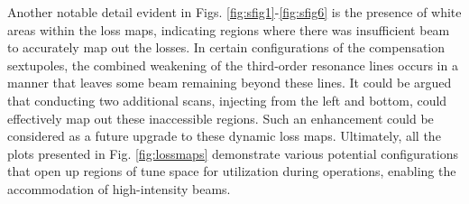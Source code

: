 Another notable detail evident in Figs. \ref{fig:sfig1}-\ref{fig:sfig6} is the presence of white areas within the loss maps, indicating regions where there was insufficient beam to accurately map out the losses. In certain configurations of the compensation sextupoles, the combined weakening of the third-order resonance lines occurs in a manner that leaves some beam remaining beyond these lines. It could be argued that conducting two additional scans, injecting from the left and bottom, could effectively map out these inaccessible regions. Such an enhancement could be considered as a future upgrade to these dynamic loss maps. Ultimately, all the plots presented in Fig. \ref{fig:lossmaps} demonstrate various potential configurations that open up regions of tune space for utilization during operations, enabling the accommodation of high-intensity beams.

